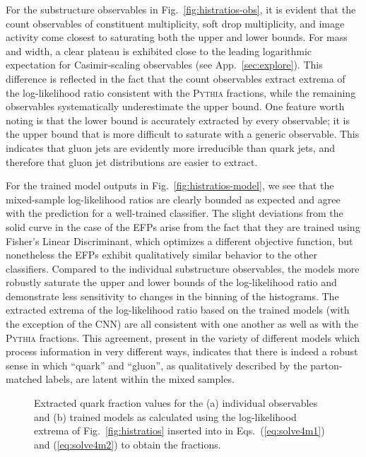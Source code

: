 \documentclass[letterpaper,11pt]{article}
\DeclareRobustCommand{\App}[1]{App.~\ref{#1}}
\DeclareRobustCommand{\Fig}[1]{Fig.~\ref{#1}}
\DeclareRobustCommand{\Eqs}[2]{Eqs.~(\ref{#1}) and (\ref{#2})}
\newcommand{\pythia}{\textsc{Pythia}\xspace}
\begin{document}
For the substructure observables in \Fig{fig:histratios-obs}, it is evident that the count observables of constituent multiplicity, soft drop multiplicity, and image activity come closest to saturating both the upper and lower bounds.
%
For mass and width, a clear plateau is exhibited close to the leading logarithmic expectation for Casimir-scaling observables (see \App{sec:explore}).
%
This difference is reflected in the fact that the count observables extract extrema of the log-likelihood ratio consistent with the \pythia fractions, while the remaining observables systematically underestimate the upper bound.
%
One feature worth noting is that the lower bound is accurately extracted by every observable; it is the upper bound that is more difficult to saturate with a generic observable.
%
This indicates that gluon jets are evidently more irreducible than quark jets, and therefore that gluon jet distributions are easier to extract.


For the trained model outputs in \Fig{fig:histratios-model}, we see that the mixed-sample log-likelihood ratios are clearly bounded as expected and agree with the prediction for a well-trained classifier.
%
The slight deviations from the solid curve in the case of the EFPs arise from the fact that they are trained using Fisher's Linear Discriminant, which optimizes a different objective function, but nonetheless the EFPs exhibit qualitatively similar behavior to the other classifiers.
%
Compared to the individual substructure observables, the models more robustly saturate the upper and lower bounds of the log-likelihood ratio and demonstrate less sensitivity to changes in the binning of the histograms.
%
The extracted extrema of the log-likelihood ratio based on the trained models (with the exception of the CNN) are all consistent with one another as well as with the \pythia fractions.
%
This agreement, present in the variety of different models which process information in very different ways, indicates that there is indeed a robust sense in which ``quark'' and ``gluon'', as qualitatively described by the parton-matched labels, are latent within the mixed samples.


\begin{figure}[t]
\centering
{}
\caption{
%
Extracted quark fraction values for the (a) individual observables and (b) trained models as calculated using the log-likelihood extrema of \Fig{fig:histratios} inserted into in \Eqs{eq:solve4m1}{eq:solve4m2} to obtain the fractions.
}
\label{fig:fracs}
\end{figure}
\end{document}

